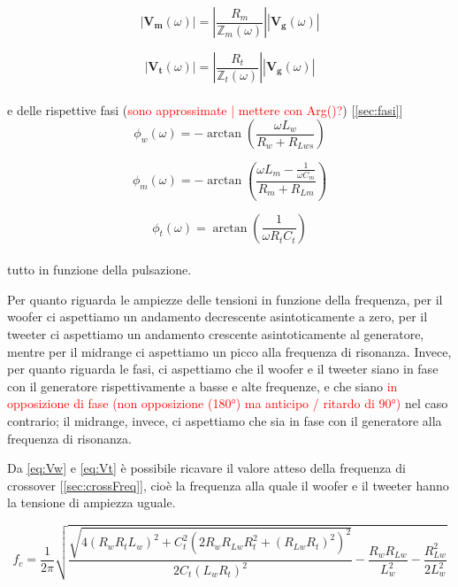 \documentclass[12pt,italian]{article}
\newcommand{\err}[1]{\textcolor{red}{#1}}
\begin{document}
\begin{equation}
  \left| \mathbf{V_{m}}(\omega) \right| = \left| \frac{R_{m}}
  {\mathbb{Z}_{m}(\omega)}\right|\left| \mathbf{V_{g}}(\omega) \right|
  \label{eq:Vm}
\end{equation}

\begin{equation}
  \left| \mathbf{V_{t}}(\omega) \right| = \left| \frac{R_{t}}
  {\mathbb{Z}_{t}(\omega)}\right|\left| \mathbf{V_{g}}(\omega) \right|
  \label{eq:Vt}
\end{equation}
\\
e delle rispettive fasi (\err{sono approssimate | mettere con Arg()?}) [\ref{sec:fasi}]
\begin{equation}
  \phi_{w}(\omega) = - \arctan\left(\frac{\omega L_{w}}{R_{w}+R_{Lws}}\right)
\end{equation}

\begin{equation}
  \phi_{m}(\omega) = - \arctan\left(\frac{\omega L_{m} - \frac{1}{\omega C_{m}}}{R_{m}+R_{Lm}}\right)
\end{equation}

\begin{equation}
  \phi_{t}(\omega) = \arctan\left(\frac{1}{\omega R_{t} C_{t}}\right)
\end{equation}
\\
tutto in funzione della pulsazione.

Per quanto riguarda le ampiezze delle tensioni in funzione della frequenza, per
il woofer ci aspettiamo un andamento decrescente asintoticamente a zero, per il
tweeter ci aspettiamo un andamento crescente asintoticamente al generatore,
mentre per il midrange ci aspettiamo un picco alla frequenza di risonanza.
Invece, per quanto riguarda le fasi, ci aspettiamo che il woofer e il tweeter
siano in fase con il generatore rispettivamente a basse e alte frequenze, e che
siano \err{in opposizione di fase (non opposizione (180°) ma anticipo / ritardo
  di 90°)} nel caso contrario; il midrange, invece, ci aspettiamo che sia in fase
con il generatore alla frequenza di risonanza.

Da \eqref{eq:Vw} e \eqref{eq:Vt} è possibile ricavare il valore atteso della
frequenza di crossover [\ref{sec:crossFreq}], cioè la frequenza alla quale il
woofer e il tweeter hanno la tensione di ampiezza uguale.

\begin{equation}
  f_{c} = \frac{1}{2\pi}\sqrt{\frac{\sqrt{4 (R_{w} R_{t} L_{w})^2 + C_{t}^2(2
        R_{w} R_{Lw} R_{t}^2 + (R_{Lw} R_{t})^2)^2}}{2 C _{t} (L_{w} R_{t})^2 } -
    \frac{R_{w} R_{Lw}}{L_{w}^2} - \frac{R_{Lw}^2}{2 L_{w}^2}}
  \label{eq:fc}
\end{equation}
\end{document}
